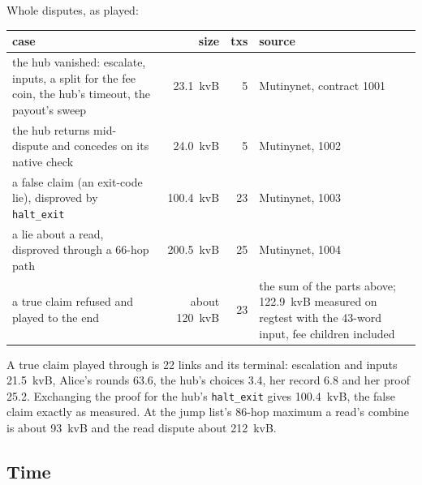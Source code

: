 \documentclass[11pt]{article}
\newcommand{\tx}[1]{\texttt{#1}}
\begin{document}
Whole disputes, as played:
\begin{center}
\small
\begin{tabularx}{\linewidth}{>{\raggedright\arraybackslash}p{62mm}rrL}
\toprule
case & size & txs & source \\
\midrule
the hub vanished: escalate, inputs, a split for the fee coin, the hub's timeout, the payout's sweep & 23.1~kvB & 5 & Mutinynet, contract 1001 \\
the hub returns mid-dispute and concedes on its native check & 24.0~kvB & 5 & Mutinynet, 1002 \\
a false claim (an exit-code lie), disproved by \tx{halt\_exit} & 100.4~kvB & 23 & Mutinynet, 1003 \\
a lie about a read, disproved through a 66-hop path & 200.5~kvB & 25 & Mutinynet, 1004 \\
a true claim refused and played to the end & about 120~kvB & 23 & the sum of the parts above; 122.9~kvB measured on regtest with the 43-word input, fee children included \\
\bottomrule
\end{tabularx}
\end{center}
A true claim played through is 22 links and its terminal: escalation and
inputs 21.5~kvB, Alice's rounds 63.6, the hub's choices 3.4, her record
6.8 and her proof 25.2. Exchanging the proof for the hub's
\tx{halt\_exit} gives 100.4~kvB, the false claim exactly as measured. At
the jump list's 86-hop maximum a read's combine is about 93~kvB and the
read dispute about 212~kvB.

\subsection{Time}
\end{document}
